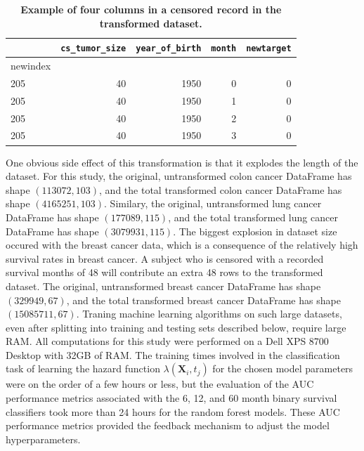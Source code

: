 \documentclass[10pt,letterpaper]{article}
\newcommand{\codewhite}[1]{\colorbox{white}{\texttt{#1}}}
\begin{document}
\begin{table}[H]
\begin{adjustwidth}{-2.25in}{0in} %
\caption{\label{tab:transformedalive} {\bf Example of four columns in a censored record in the transformed dataset.}}
\begin{tabular}{lrrrr}
\toprule
{} &  \codewhite{cs\_tumor\_size} &  \codewhite{year\_of\_birth} &  \codewhite{month} &  \codewhite{newtarget} \\
\midrule
newindex &                &                &        &            \\
205      &             40 &           1950 &      0 &          0 \\
205      &             40 &           1950 &      1 &          0 \\
205      &             40 &           1950 &      2 &          0 \\
205      &             40 &           1950 &      3 &          0 \\
\bottomrule
\end{tabular}
\end{adjustwidth}
\end{table}



One obvious side effect of this transformation is that it explodes the length of the dataset.
For this study, the original, untransformed colon cancer DataFrame has shape $(113072, 103)$, and the total transformed colon cancer DataFrame has shape $(4165251, 103)$.
Similary, the original, untransformed lung cancer DataFrame has shape $(177089, 115)$, and the total transformed lung cancer DataFrame has shape $(3079931, 115)$.
The biggest explosion in dataset size occured with the breast cancer data, which is a consequence of the relatively high survival rates in breast cancer. A subject who is censored with a recorded survival months of 48 will contribute an extra 48 rows to the transformed dataset.  
The original, untransformed breast cancer DataFrame has shape $(329949, 67)$, and the total transformed breast cancer DataFrame has shape $(15085711, 67)$.
Traning machine learning algorithms on such large datasets, even after splitting into training and testing sets described below, require large RAM. All computations for this study were performed on a Dell XPS 8700 Desktop with 32GB of RAM. The training times involved in the classification task of learning the hazard function $\lambda(\mathbf{X}_{i}, t_{j})$ for the chosen model parameters were on the order of a few hours or less, but the evaluation of the AUC performance metrics associated with the 6, 12, and 60 month binary survival classifiers
 took more than 24 hours for the random forest models. These AUC performance metrics provided the feedback mechanism to adjust the model hyperparameters.
\end{document}
